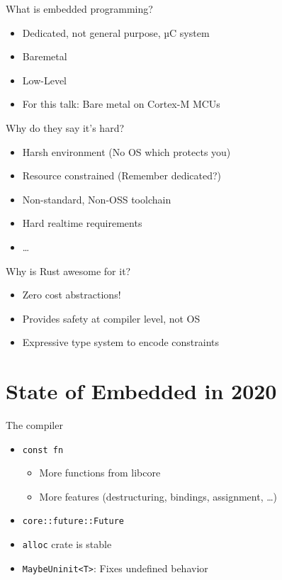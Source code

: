 \documentclass[aspectratio=1610,14pt,t]{beamer}
\begin{document}
\begin{frame}[c]{What is embedded programming?}
  \begin{itemize}
    \item Dedicated, not general purpose, µC system
    \item<1-> Baremetal
    \item<1-> Low-Level
    \item<2-> For this talk: Bare metal on Cortex-M MCUs
  \end{itemize}
\end{frame}

\begin{frame}[c]{Why do they say it's hard?}
  \begin{itemize}
    \item Harsh environment (No OS which protects you)
    \item Resource constrained (Remember dedicated?)
    \item Non-standard, Non-OSS toolchain
    \item Hard realtime requirements
    \item \ldots
  \end{itemize}
\end{frame}

\begin{frame}[c]{Why is Rust awesome for it?}
  \begin{itemize}
    \item Zero cost abstractions!
    \item Provides safety at compiler level, not OS
    \item Expressive type system to encode constraints
  \end{itemize}
\end{frame}

\section{State of Embedded in 2020}
\begin{frame}[c]{The compiler}
  \begin{itemize}
    \item \texttt{const fn}
      \begin{itemize}
        \item More functions from libcore
        \item More features (destructuring, bindings, assignment, \ldots)
      \end{itemize}
    \item \texttt{core::future::Future}
    \item \texttt{alloc} crate is stable
    \item \texttt{MaybeUninit<T>}: Fixes undefined behavior
  \end{itemize}
\end{frame}
\end{document}
